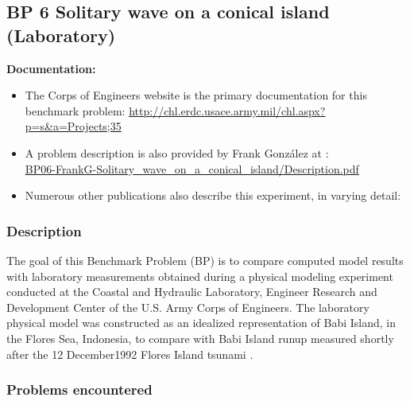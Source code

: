 \subsection{BP 6
  Solitary wave on a conical island (Laboratory)}

{\bf Documentation:}
\begin {itemize}


\item The Corps of Engineers website is the primary documentation for this benchmark problem:
\url{http://chl.erdc.usace.army.mil/chl.aspx?p=s&a=Projects;35}
\item A problem description is also provided by Frank Gonz\'alez 
 at \cite{bp-description}:\\
\href{https://github.com/rjleveque/nthmp-benchmark-problems/blob/master/BP06-FrankG-Solitary_wave_on_a_conical_island/Description.pdf}
{BP06-FrankG-Solitary\_wave\_on\_a\_conical\_island/Description.pdf} 
\item Numerous other publications also describe this experiment, in varying detail: \cite{SynolakisBernard:pmel135, Briggs1994, Liu1994, Briggs1995, Liu1995, Briggs1996, Fujima2000}
\end{itemize} 

\subsubsection{Description}
The goal of this Benchmark Problem (BP) is to compare computed model results with laboratory measurements obtained during a physical modeling experiment conducted at the Coastal and Hydraulic Laboratory, Engineer Research and Development Center of the U.S. Army Corps of Engineers.  The laboratory physical model was constructed as an idealized representation of Babi Island, in the Flores Sea, Indonesia, to compare with Babi Island runup measured shortly after the 12 December1992 Flores Island tsunami \cite{Yeh1994}.

\subsubsection {Problems encountered}

